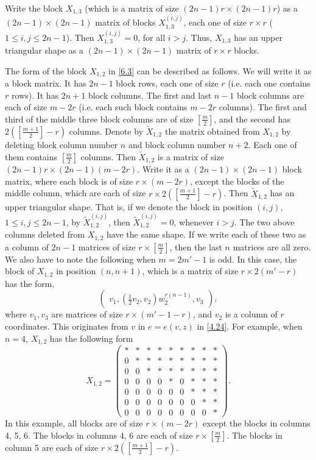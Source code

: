 \documentclass[12pts]{amsart}
\begin{document}
Write the block $X_{1,3}$ (which is a matrix of size $(2n-1)r\times
(2n-1)r$) as a $(2n-1)\times (2n-1)$ matrix of blocks
$X_{1,3}^{(i,j)}$, each one of size $r\times r$ ($1\leq i,j\leq
2n-1$). Then $X_{1,3}^{(i,j)}=0$, for all $i>j$. Thus, $X_{1,3}$ has
an upper triangular shape as a $(2n-1)\times (2n-1)$ matrix of
$r\times r$ blocks.

The form of the block $X_{1,2}$ in \eqref{6.3} can be described as
follows. We  will write it as a block matrix. It has $2n-1$ block
rows, each one of size $r$ (i.e. each one contains $r$ rows). It has $2n+1$ block columns. The first and last
$n-1$ block columns are each of size $m-2r$ (i.e. each such block contains $m-2r$ columns).
The first and third of the middle three block columns are of size $[\frac{m}{2}]$, and
the second has $2([\frac{m+1}{2}]-r)$ columns. Denote by $\widetilde{X}_{1,2}$ the matrix obtained from
$X_{1,2}$ by deleting block column number $n$ and block column
number $n+2$. Each one of them contains $[\frac{m}{2}]$ columns. Then
$\widetilde{X}_{1,2}$ is a matrix of size $(2n-1)r\times (2n-1)(m-2r)$.
Write it as a $(2n-1)\times (2n-1)$ block matrix, where each block
is of size $r\times (m-2r)$, except the blocks of the middle column, which are each of size $r\times 2([\frac{m+1}{2}]-r)$. Then $\widetilde{X}_{1,2}$ has an upper
triangular shape. That is, if we denote the block in position
$(i,j)$, $1\leq i,j\leq 2n-1$, by $\widetilde{X}_{1,2}^{(i,j)}$, then $\widetilde{X}_{1,2}^{(i,j)}=0$, whenever
$i>j$. The two above columns deleted from $X_{1,2}$ have the same shape. If we write each
of these two as a column of $2n-1$ matrices of size $r\times
[\frac{m}{2}]$, then the last $n$ matrices are all zero. We also have to note the following when $m=2m'-1$ is odd. In this case, the block of $X_{1,2}$ in position $(n,n+1)$, which is a matrix of size $r\times 2(m'-r)$ has the form, 
\begin{equation}\label{6.5.2.1}
\begin{pmatrix}v_1,(\frac{1}{2}v_2,v_2)w_2^{r(n-1)},v_3\end{pmatrix}, 
\end{equation}
where $v_1,v_3$ are matrices of size $r\times (m'-1-r)$, and $v_2$ is a  column of $r$ coordinates. This originates from $v$ in $e=e(v,z)$ in \eqref{4.24}. For example, when $n=4$, $X_{1,2}$ has the following form
\begin{equation}\label{6.5.3}
X_{1,2}=\begin{pmatrix}\ast&\ast&\ast&\ast&\ast&\ast&\ast&\ast&\ast\\
0&\ast&\ast&\ast&\ast&\ast&\ast&\ast&\ast\\
0&0&\ast&\ast&\ast&\ast&\ast&\ast&\ast\\
0&0&0&0&\ast&0&\ast&\ast&\ast\\0&0&0&0&0&0&\ast&\ast&\ast\\
0&0&0&0&0&0&0&\ast&\ast\\0&0&0&0&0&0&0&0&\ast\end{pmatrix}.
\end{equation}
In this example, all blocks are of size $r\times (m-2r)$ except the
blocks in columns 4, 5, 6. The blocks in columns 4, 6 are each of size $r\times [\frac{m}{2}]$. The blocks in column 5 are each of size $r\times 2([\frac{m+1}{2}]-r)$.
 
\end{document}
